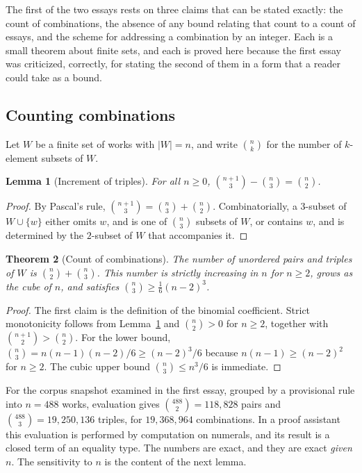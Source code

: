 \documentclass[11pt]{article}
\theoremstyle{plain}
\newtheorem{theorem}{Theorem}[section]
\newtheorem{lemma}[theorem]{Lemma}
\theoremstyle{definition}
\theoremstyle{remark}
\begin{document}
The first of the two essays rests on three claims that can be stated exactly: the count of combinations, the absence of any bound relating that count to a count of essays, and the scheme for addressing a combination by an integer. Each is a small theorem about finite sets, and each is proved here because the first essay was criticized, correctly, for stating the second of them in a form that a reader could take as a bound.

\subsection{Counting combinations}

Let $W$ be a finite set of works with $|W|=n$, and write $\binom{n}{k}$ for the number of $k$-element subsets of $W$.

\begin{lemma}[Increment of triples]\label{lem:inc}
For all $n\ge 0$, $\binom{n+1}{3}-\binom{n}{3}=\binom{n}{2}$.
\end{lemma}

\begin{proof}
By Pascal's rule, $\binom{n+1}{3}=\binom{n}{3}+\binom{n}{2}$. Combinatorially, a $3$-subset of $W\cup\{w\}$ either omits $w$, and is one of $\binom{n}{3}$ subsets of $W$, or contains $w$, and is determined by the $2$-subset of $W$ that accompanies it. \qedhere
\end{proof}

\begin{theorem}[Count of combinations]\label{thm:count}
The number of unordered pairs and triples of $W$ is $\binom{n}{2}+\binom{n}{3}$. This number is strictly increasing in $n$ for $n\ge 2$, grows as the cube of $n$, and satisfies $\binom{n}{3}\ge\tfrac{1}{6}(n-2)^3$.
\end{theorem}

\begin{proof}
The first claim is the definition of the binomial coefficient. Strict monotonicity follows from Lemma~\ref{lem:inc} and $\binom{n}{2}>0$ for $n\ge2$, together with $\binom{n+1}{2}>\binom{n}{2}$. For the lower bound, $\binom{n}{3}=n(n-1)(n-2)/6\ge(n-2)^3/6$ because $n(n-1)\ge(n-2)^2$ for $n\ge2$. The cubic upper bound $\binom{n}{3}\le n^3/6$ is immediate. \qedhere
\end{proof}

For the corpus snapshot examined in the first essay, grouped by a provisional rule into $n=488$ works, evaluation gives $\binom{488}{2}=118{,}828$ pairs and $\binom{488}{3}=19{,}250{,}136$ triples, for $19{,}368{,}964$ combinations. In a proof assistant this evaluation is performed by computation on numerals, and its result is a closed term of an equality type. The numbers are exact, and they are exact \emph{given} $n$. The sensitivity to $n$ is the content of the next lemma.
\end{document}
